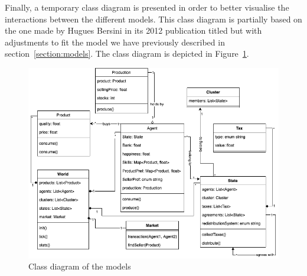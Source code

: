 Finally, a temporary class diagram is presented in order to better visualise the interactions between the different models. This class diagram is partially based on the one made by Hugues Bersini in its 2012 publication titled  \cite{umbforabm} but with adjustments to fit the model we have previously described in section~\ref{section:models}. The class diagram is depicted in Figure~\ref{fig:class_diagram}.


    \begin{figure}[H]
        \centering
        \includegraphics[width=1\textwidth]{img/class_diagram.png}
        \caption{Class diagram of the models}
        \label{fig:class_diagram}
    \end{figure}

